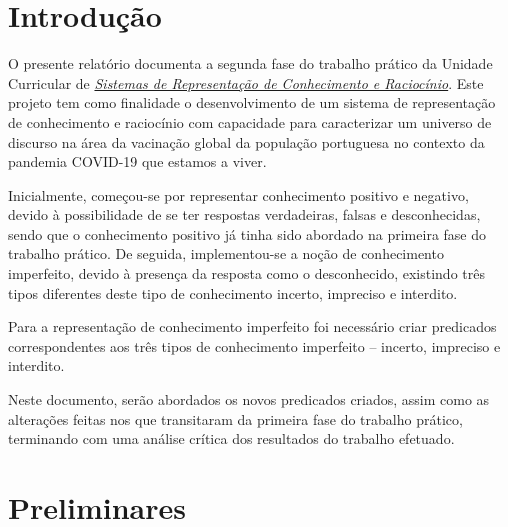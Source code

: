 \documentclass[a4paper, 11pt]{article}
\begin{document}
\pagebreak

\tableofcontents

\pagebreak

\lstlistoflistings

\listoftables

\pagebreak


\pagestyle{fancy}
\fancyhf{}


\renewcommand{\headrulewidth}{0pt}

\section{Introdução}

O presente relatório documenta a segunda fase do trabalho prático da Unidade Curricular de 
\href{https://miei.di.uminho.pt/plano_estudos.html#sistemas_de_representa_o_de_conhecimento_e_racioc
_nio}
{\emph{Sistemas de Representação de Conhecimento e Raciocínio}}. Este projeto tem como 
finalidade o desenvolvimento de um sistema de representação de conhecimento
e raciocínio com capacidade para caracterizar um universo de discurso na área da 
vacinação global da população portuguesa no contexto
da pandemia COVID-19 que estamos a viver.

Inicialmente, começou-se por representar conhecimento positivo e negativo, devido à
possibilidade de se ter respostas verdadeiras, falsas e desconhecidas, sendo que o
conhecimento positivo já tinha sido abordado na primeira fase do trabalho prático.
De seguida, implementou-se a noção de conhecimento imperfeito, devido à presença
da resposta como o desconhecido, existindo três tipos diferentes deste tipo de conhecimento
incerto, impreciso e interdito. 

Para a representação de conhecimento imperfeito foi necessário criar predicados correspondentes 
aos três tipos de conhecimento imperfeito -- incerto, impreciso e interdito. 

Neste documento, serão abordados os novos predicados criados, assim como as
alterações feitas nos que transitaram da primeira fase do trabalho prático, terminando com uma 
análise crítica dos resultados do trabalho efetuado.

\pagebreak

\section{Preliminares}
\end{document}
